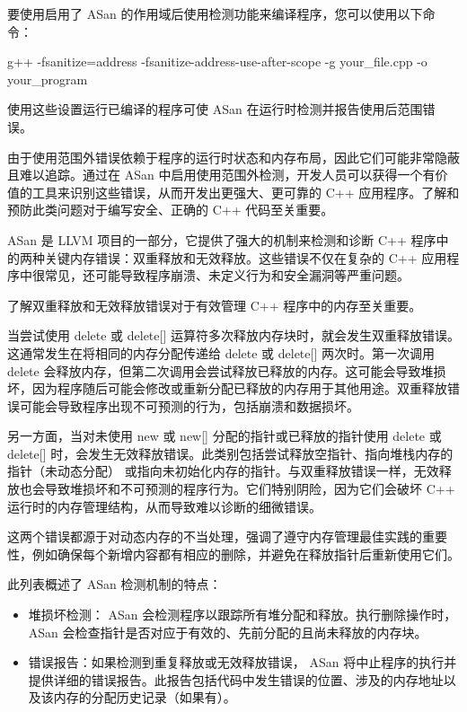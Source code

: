 要使用启用了 ASan 的作用域后使用检测功能来编译程序，您可以使用以下命令：

\begin{shell}
g++ -fsanitize=address -fsanitize-address-use-after-scope -g your_file.cpp -o your_program
\end{shell}

使用这些设置运行已编译的程序可使 ASan 在运行时检测并报告使用后范围错误。

由于使用范围外错误依赖于程序的运行时状态和内存布局，因此它们可能非常隐蔽且难以追踪。通过在 ASan 中启用使用范围外检测，开发人员可以获得一个有价值的工具来识别这些错误，从而开发出更强大、更可靠的 C++ 应用程序。了解和预防此类问题对于编写安全、正确的 C++ 代码至关重要。


ASan 是 LLVM 项目的一部分，它提供了强大的机制来检测和诊断 C++ 程序中的两种关键内存错误：双重释放和无效释放。这些错误不仅在复杂的 C++ 应用程序中很常见，还可能导致程序崩溃、未定义行为和安全漏洞等严重问题。


了解双重释放和无效释放错误对于有效管理 C++ 程序中的内存至关重要。

当尝试使用 delete 或 delete[] 运算符多次释放内存块时，就会发生双重释放错误。这通常发生在将相同的内存分配传递给 delete 或 delete[] 两次时。第一次调用 delete 会释放内存，但第二次调用会尝试释放已释放的内存。这可能会导致堆损坏，因为程序随后可能会修改或重新分配已释放的内存用于其他用途。双重释放错误可能会导致程序出现不可预测的行为，包括崩溃和数据损坏。

另一方面，当对未使用 new 或 new[] 分配的指针或已释放的指针使用 delete 或 delete[] 时，会发生无效释放错误。此类别包括尝试释放空指针、指向堆栈内存的指针（未动态分配） 或指向未初始化内存的指针。与双重释放错误一样，无效释放也会导致堆损坏和不可预测的程序行为。它们特别阴险，因为它们会破坏 C++ 运行时的内存管理结构，从而导致难以诊断的细微错误。

这两个错误都源于对动态内存的不当处理，强调了遵守内存管理最佳实践的重要性，例如确保每个新增内容都有相应的删除，并避免在释放指针后重新使用它们。

此列表概述了 ASan 检测机制的特点：

\begin{itemize}
\item
堆损坏检测： ASan 会检测程序以跟踪所有堆分配和释放。执行删除操作时， ASan 会检查指针是否对应于有效的、先前分配的且尚未释放的内存块。

\item
错误报告：如果检测到重复释放或无效释放错误， ASan 将中止程序的执行并提供详细的错误报告。此报告包括代码中发生错误的位置、涉及的内存地址以及该内存的分配历史记录（如果有）。
\end{itemize}

